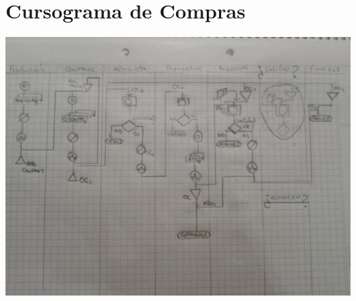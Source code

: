 \pagebreak
\section{Cursograma de Compras}
\includegraphics [scale=0.22 ,angle=90]{Empresa/Circuitos/Compras/Compras.jpg}

\pagebreak
